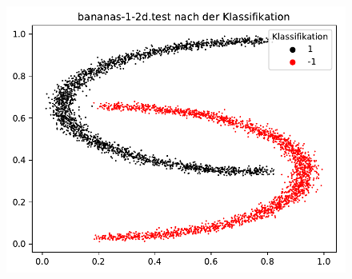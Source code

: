\documentclass{beamer}
\begin{document}
\begin{figure}[h]
\centering
\includegraphics[scale=0.7]{bananas-1-2d-test-nacher.pdf}
\label{bananas}
\end{figure}
\end{document}
